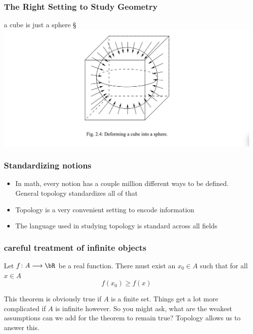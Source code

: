 \documentclass{beamer}
\begin{document}
\begin{frame}
    \frametitle{The Right Setting to Study Geometry}

    \begin{block}{a cube is just a sphere}
        §\includegraphics[width=\textwidth]{assets/cubetosphere.png}
    \end{block}

\end{frame}


\begin{frame}
    \frametitle{Standardizing notions}

    \begin{itemize}
        \item In math, every notion has a couple million different ways to be defined. General topology standardizes all of that \pause
        \item Topology is a very convenient setting to encode information \pause
        \item The language used in studying topology is standard across all fields
    \end{itemize}

\end{frame}

\begin{frame}
    \frametitle{careful treatment of infinite objects}

    \begin{theorem}[(false)]
        Let $f\colon A\longrightarrow \bR$ be a real function. There must exist an $x_0\in A$ such that for all $x\in A$
        \[f(x_0)\geq f(x)\]
    \end{theorem} \pause
    This theorem is obviously true if $A$ is a finite set. \pause Things get a lot more complicated if $A$ is infinite however. So you might ask, what 
    are the weakest assumptions can we add for the theorem to remain true? \pause Topology allows us to answer this.

\end{frame}
\end{document}
